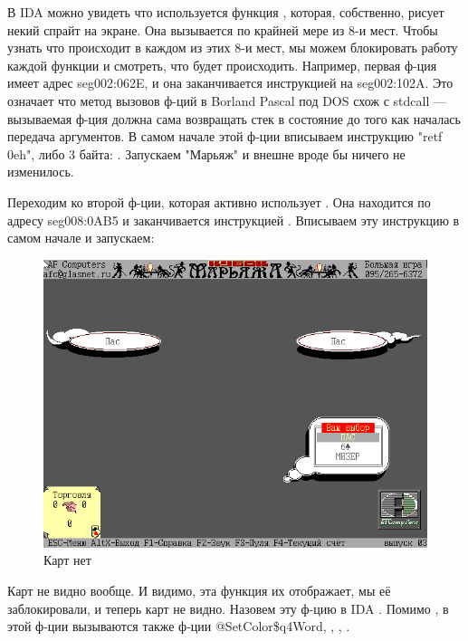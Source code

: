 В IDA можно увидеть что используется функция , которая, собственно,
рисует некий спрайт на экране.
Она вызывается по крайней мере из 8-и мест.
Чтобы узнать что происходит в каждом из этих 8-и мест, мы можем блокировать работу каждой функции и смотреть,
что будет происходить.
Например, первая ф-ция имеет адрес seg002:062E, и она заканчивается инструкцией  на seg002:102A.
Это означает что метод вызовов ф-ций в Borland Pascal под DOS схож с stdcall --- вызываемая ф-ция должна сама
возвращать стек в состояние до того как началась передача аргументов.
В самом начале этой ф-ции вписываем инструкцию "retf 0eh", либо 3 байта: .
Запускаем "Марьяж" и внешне вроде бы ничего не изменилось.

Переходим ко второй ф-ции, которая активно использует .
Она находится по адресу seg008:0AB5 и заканчивается инструкцией .
Вписываем эту инструкцию в самом начале и запускаем:

\begin{figure}[H]
\centering
\includegraphics[scale=\FigScale]{examples/marriage/draw_card_bypass.png}
\caption{Карт нет}
\end{figure}

Карт не видно вообще. И видимо, эта функция их отображает, мы её заблокировали, и теперь карт не видно.
Назовем эту ф-цию в IDA .
Помимо , в этой ф-ции вызываются также ф-ции @SetColor\$q4Word, 
, , .


